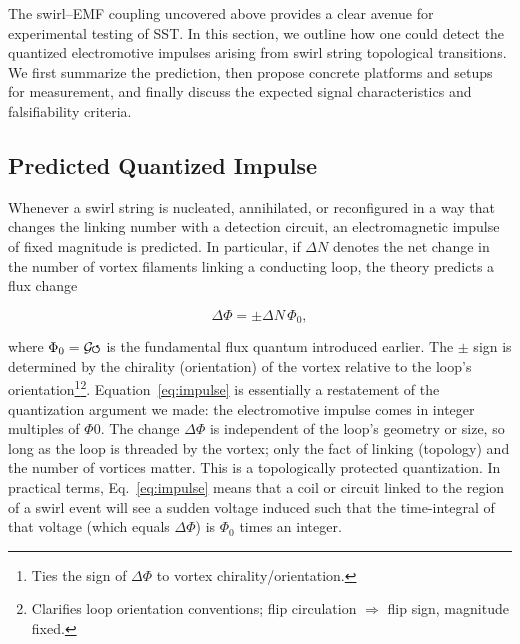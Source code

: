 \documentclass[12pt]{article}
\DeclareRobustCommand{\swirlarrow}{
\mathchoice{\mkern-2mu\scriptstyle\boldsymbol{\circlearrowleft}}%
{\mkern-2mu\scriptstyle\boldsymbol{\circlearrowleft}}%
{\mkern-2mu\scriptscriptstyle\boldsymbol{\circlearrowleft}}%
{\mkern-2mu\scriptscriptstyle\boldsymbol{\circlearrowleft}}
}%
\newcommand{\Gswirl}{\mathcal{G}\swirlarrow}
\begin{document}
The swirl–EMF coupling uncovered above provides a clear avenue for experimental testing of SST. In this section, we outline how one could detect the quantized electromotive impulses arising from swirl string topological transitions. We first summarize the prediction, then propose concrete platforms and setups for measurement, and finally discuss the expected signal characteristics and falsifiability criteria.


\subsection{Predicted Quantized Impulse}\label{sec:prediction}

Whenever a swirl string is nucleated, annihilated, or reconfigured in a way that changes the linking number with a detection circuit, an electromagnetic impulse of fixed magnitude is predicted. In particular, if $\Delta N$ denotes the net change in the number of vortex filaments linking a conducting loop, the theory predicts a flux change

\begin{equation}\label{eq:impulse}

\Delta \Phi = \pm \Delta N \,\Phi_{0},
\end{equation}

where $\Phi_{0} = \Gswirl$ is the fundamental flux quantum introduced earlier. The $\pm$ sign is determined by the chirality (orientation) of the vortex relative to the loop’s orientation\footnote{Ties the sign of $\Delta\Phi$ to vortex chirality/orientation.}\footnote{Clarifies loop orientation conventions; flip circulation $\Rightarrow$ flip sign, magnitude fixed.}. Equation~\eqref{eq:impulse} is essentially a restatement of the quantization argument we made: the electromotive impulse comes in integer multiples of $\Phi{0}$. The change $\Delta \Phi$ is independent of the loop's geometry or size, so long as the loop is threaded by the vortex; only the fact of linking (topology) and the number of vortices matter. This is a topologically protected quantization. In practical terms, Eq.~\eqref{eq:impulse} means that a coil or circuit linked to the region of a swirl event will see a sudden voltage induced such that the time-integral of that voltage (which equals $\Delta \Phi$) is $\Phi_{0}$ times an integer.
\end{document}
